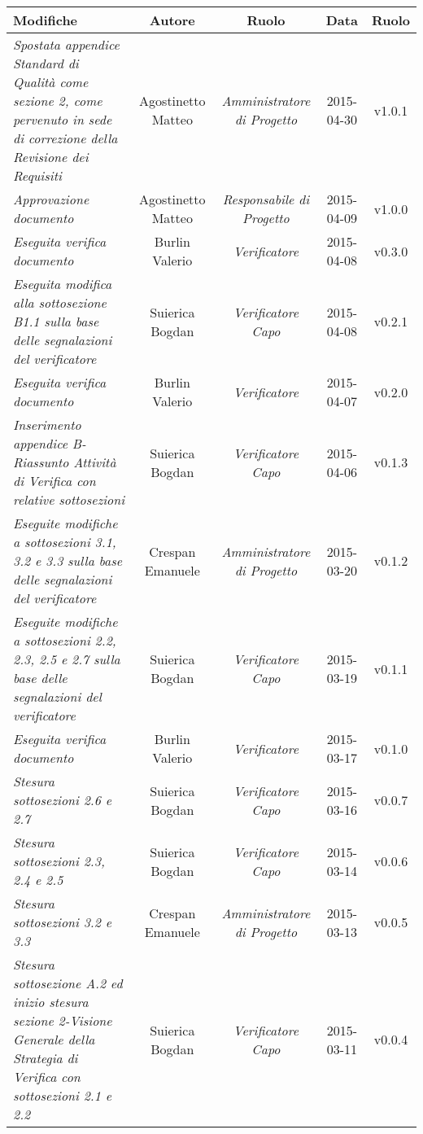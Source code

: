 \newpage

\begin{table}[h]
\centering
\begin{tabular}{|p{}|c|c|c|c|}
	\toprule
		\textbf{Modifiche} & \textbf{Autore} & \textbf{Ruolo} & \textbf{Data} & \textbf{Ruolo} \\
	\midrule
	\midrule
		\textit{Spostata appendice Standard di Qualità come sezione 2, come pervenuto in sede di correzione della Revisione dei Requisiti} & Agostinetto Matteo & \textit{Amministratore di Progetto} & 2015-04-30 & v1.0.1 \\
	\midrule
		\textit{Approvazione documento} & Agostinetto Matteo & \textit{Responsabile di Progetto} & 2015-04-09 & v1.0.0 \\
	\midrule
		\textit{Eseguita verifica documento} & Burlin Valerio & \textit{Verificatore} & 2015-04-08 & v0.3.0 \\
	\midrule
		\textit{Eseguita modifica alla sottosezione B1.1 sulla base delle segnalazioni del verificatore} & Suierica Bogdan & \textit{Verificatore Capo} & 2015-04-08 & v0.2.1 \\
	\midrule
		\textit{Eseguita verifica documento} & Burlin Valerio & \textit{Verificatore} & 2015-04-07 & v0.2.0 \\
	\midrule
		\textit{Inserimento appendice B-Riassunto Attività di Verifica con relative sottosezioni} & Suierica Bogdan & \textit{Verificatore Capo} & 2015-04-06 & v0.1.3 \\
	\midrule
		\textit{Eseguite modifiche a sottosezioni 3.1, 3.2 e 3.3 sulla base delle segnalazioni del verificatore} & Crespan Emanuele & \textit{Amministratore di Progetto} & 2015-03-20 & v0.1.2 \\
	\midrule
		\textit{Eseguite modifiche a sottosezioni 2.2, 2.3, 2.5 e 2.7 sulla base delle segnalazioni del verificatore} & Suierica Bogdan & \textit{Verificatore Capo} & 2015-03-19 & v0.1.1 \\
	\midrule
		\textit{Eseguita verifica documento} & Burlin Valerio & \textit{Verificatore} & 2015-03-17 & v0.1.0 \\
	\midrule
		\textit{Stesura sottosezioni 2.6 e 2.7} & Suierica Bogdan & \textit{Verificatore Capo} & 2015-03-16 & v0.0.7 \\
	\midrule
		\textit{Stesura sottosezioni 2.3, 2.4 e 2.5} & Suierica Bogdan & \textit{Verificatore Capo} & 2015-03-14 & v0.0.6 \\
	\midrule
		\textit{Stesura sottosezioni 3.2 e 3.3} & Crespan Emanuele & \textit{Amministratore di Progetto} & 2015-03-13 & v0.0.5 \\
	\midrule
		\textit{Stesura sottosezione A.2 ed inizio stesura sezione 2-Visione Generale della Strategia di Verifica con sottosezioni 2.1 e 2.2} & Suierica Bogdan & \textit{Verificatore Capo} & 2015-03-11 & v0.0.4 \\
	\bottomrule
\end{tabular}	
\end{table}

